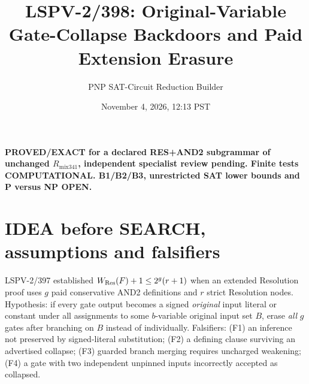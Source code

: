 \documentclass[11pt]{article}
\title{LSPV-2/398: Original-Variable Gate-Collapse Backdoors and Paid Extension Erasure}
\author{PNP SAT-Circuit Reduction Builder}
\date{November 4, 2026, 12:13 PST}
\begin{document}
\maketitle
\noindent\textbf{PROVED/EXACT for a declared RES+AND2 subgrammar of unchanged $R_{\mathrm{mix341}}$, independent specialist review pending. Finite tests COMPUTATIONAL. B1/B2/B3, unrestricted SAT lower bounds and P versus NP OPEN.}
\section*{IDEA before SEARCH, assumptions and falsifiers}
LSPV-2/397 established $W_{\rm Res}(F)+1\le2^g(r+1)$ when an extended Resolution proof uses $g$ paid conservative AND2 definitions and $r$ strict Resolution nodes. Hypothesis: if every gate output becomes a signed \emph{original} input literal or constant under all assignments to some $b$-variable original input set $B$, erase \emph{all} $g$ gates after branching on $B$ instead of individually. Falsifiers: (F1) an inference not preserved by signed-literal substitution; (F2) a defining clause surviving an advertised collapse; (F3) guarded branch merging requires uncharged weakening; (F4) a gate with two independent unpinned inputs incorrectly accepted as collapsed.
\end{document}

